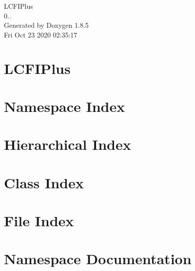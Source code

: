 \documentclass[twoside]{book}
\newcommand{\clearemptydoublepage}{%
  \newpage{\pagestyle{empty}\cleardoublepage}%
}
\begin{document}
\begin{titlepage}
\vspace*{7cm}
\begin{center}%
{\Large L\-C\-F\-I\-Plus \\[1ex]\large 0.. }\\
\vspace*{1cm}
{\large Generated by Doxygen 1.8.5}\\
\vspace*{0.5cm}
{\small Fri Oct 23 2020 02:35:17}\\
\end{center}
\end{titlepage}
\clearemptydoublepage
\tableofcontents
\clearemptydoublepage
{}

\chapter{L\-C\-F\-I\-Plus}
\label{index}
\chapter{Namespace Index}

\chapter{Hierarchical Index}

\chapter{Class Index}

\chapter{File Index}

\chapter{Namespace Documentation}






\end{document}

